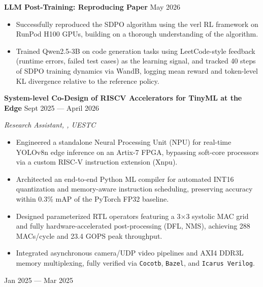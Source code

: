 \textbf{LLM Post-Training: Reproducing  Paper} \hfill May 2026

\begin{itemize}
    \item Successfully reproduced the SDPO algorithm using the verl RL framework on RunPod H100 GPUs, building on a thorough understanding of the algorithm.
    \item Trained Qwen2.5-3B on code generation tasks using LeetCode-style feedback (runtime errors, failed test cases) as the learning signal, and tracked 40 steps of SDPO training dynamics via WandB, logging mean reward and token-level KL divergence relative to the reference policy.
\end{itemize}

\textbf{System-level Co-Design of RISCV Accelerators for TinyML at the Edge} \hfill Sept 2025 --- April 2026

\vspace{-0.2em} \begin{small} \textit{Research Assistant, , UESTC} \end{small} \vspace{-0.2em}

\begin{itemize}
    \item Engineered a standalone Neural Processing Unit (NPU) for real-time YOLOv8n edge inference on an Artix-7 FPGA, bypassing soft-core processors via a custom RISC-V instruction extension (Xnpu).
    \item Architected an end-to-end Python ML compiler for automated INT16 quantization and memory-aware instruction scheduling, preserving accuracy within 0.3\% mAP of the PyTorch FP32 baseline.
    \item Designed parameterized RTL operators featuring a 3×3 systolic MAC grid and fully hardware-accelerated post-processing (DFL, NMS), achieving 288 MACs/cycle and 23.4 GOPS peak throughput.
    \item Integrated asynchronous camera/UDP video pipelines and AXI4 DDR3L memory multiplexing, fully verified via \texttt{Cocotb}, \texttt{Bazel}, and \texttt{Icarus Verilog}.
\end{itemize}

 \hfill Jan 2025 --- Mar 2025

